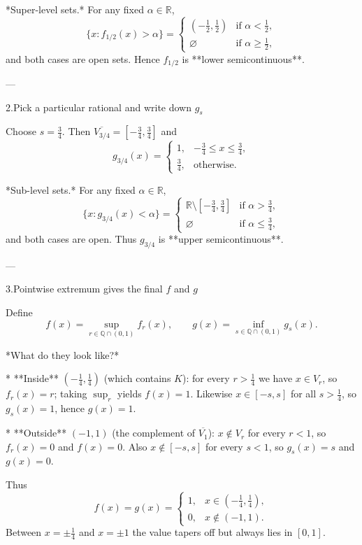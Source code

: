 \documentclass[12pt]{article}
\theoremstyle{definition} %
\theoremstyle{plain} %
\begin{document}
*Super-level sets.*  
For any fixed $\alpha\in\mathbb R$,
\[
    \bigl\{x: f_{1/2}(x)>\alpha\bigr\}=
    \begin{cases}
        (-\tfrac12,\tfrac12) &\text{if }\alpha<\tfrac12,\\
        \varnothing          &\text{if }\alpha\ge\tfrac12,
    \end{cases}
\]
and both cases are open sets.  
Hence \(f_{1/2}\) is **lower semicontinuous**.

---

2.\;Pick a particular rational and write down \(g_s\)

Choose \(s=\tfrac34\).  
Then $\overline{V_{3/4}}=[-\tfrac34,\tfrac34]$ and
\[
    g_{3/4}(x)=
    \begin{cases}
        1, & -\tfrac34 \le x \le \tfrac34,\\[4pt]
        \tfrac34, & \text{otherwise}.
    \end{cases}
\]

*Sub-level sets.*  
For any fixed $\alpha\in\mathbb R$,
\[
    \bigl\{x: g_{3/4}(x)<\alpha\bigr\}=
    \begin{cases}
        \mathbb R\setminus[-\tfrac34,\tfrac34] &\text{if }\alpha>\tfrac34,\\
        \varnothing                            &\text{if }\alpha\le\tfrac34,
    \end{cases}
\]
and both cases are open.  
Thus \(g_{3/4}\) is **upper semicontinuous**.

---

3.\;Pointwise extremum gives the final \(f\) and \(g\)

Define
\[
    f(x)=\sup_{r\in\mathbb Q\cap(0,1)} f_r(x),
    \qquad
    g(x)=\inf_{s\in\mathbb Q\cap(0,1)} g_s(x).
\]

*What do they look like?*

* **Inside** $(-\tfrac14,\tfrac14)$ (which contains $K$):  
  for every $r>\tfrac14$ we have $x\in V_r$, so
  $f_r(x)=r$; taking $\sup_r$ yields $f(x)=1$.
  Likewise $x\in[-s,s]$ for all $s>\tfrac14$, so $g_s(x)=1$, hence
  $g(x)=1$.

* **Outside** $(-1,1)$ (the complement of $\overline{V_{1}}$):  
  $x\notin V_r$ for every $r<1$, so $f_r(x)=0$ and $f(x)=0$.
  Also $x\notin[-s,s]$ for every $s<1$, so $g_s(x)=s$ and $g(x)=0$.

Thus
\[
    f(x)=g(x)=
    \begin{cases}
        1, & x\in(-\tfrac14,\tfrac14),\\
        0, & x\notin(-1,1).
    \end{cases}
\]
Between $x=\pm\tfrac14$ and $x=\pm1$ the value tapers off but always
lies in $[0,1]$.
\end{document}
